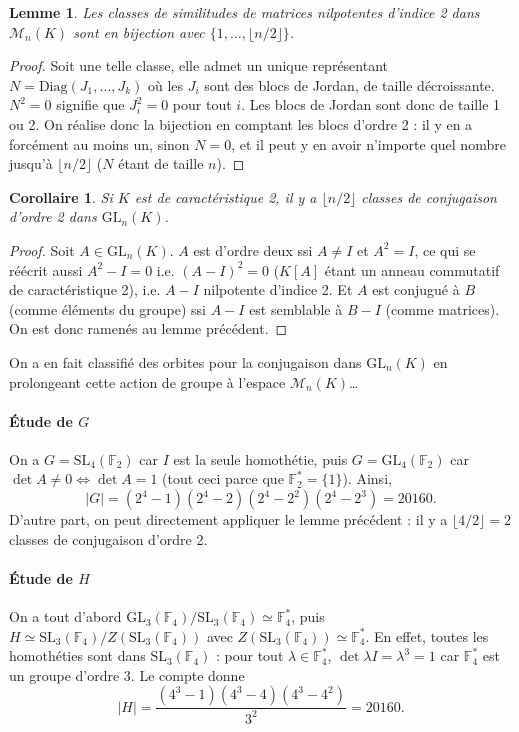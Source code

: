 \documentclass[a4paper, 11pt]{article}
\def\F{\mathbb{F}}
\def\M{\mathcal{M}}
\def\GL{\mathrm{GL}}
\def\SL{\mathrm{SL}}
\newtheorem*{lemma}{Lemme}
\newtheorem*{corollary}{Corollaire}
\begin{document}
\begin{lemma}
  Les classes de similitudes de matrices nilpotentes d'indice 2 dans $\M_n(K)$
  sont en bijection avec $\{1, \ldots, \lfloor n/2 \rfloor\}$.
\end{lemma}
\begin{proof}
  Soit une telle classe, elle admet un unique représentant $N =
  \mathrm{Diag}(J_1, \ldots, J_k)$ où les $J_i$ sont des blocs de Jordan, de
  taille décroissante. $N^2 = 0$ signifie que $J_i^2 = 0$ pour tout $i$. Les
  blocs de Jordan sont donc de taille 1 ou 2. On réalise donc la bijection en
  comptant les blocs d'ordre 2 : il y en a forcément au moins un, sinon $N = 0$,
  et il peut y en avoir n'importe quel nombre jusqu'à $\lfloor n/2 \rfloor$ ($N$
  étant de taille $n$).
\end{proof}
\begin{corollary}
  Si $K$ est de caractéristique 2, il y a $\lfloor n/2 \rfloor$ classes de
  conjugaison d'ordre 2 dans $\GL_n(K)$.
\end{corollary}
\begin{proof}
  Soit $A \in \GL_n(K)$. $A$ est d'ordre deux ssi $A \neq I$ et $A^2 = I$, ce
  qui se réécrit aussi $A^2 - I = 0$ i.e. $(A-I)^2 = 0$ ($K[A]$ étant un anneau
  commutatif de caractéristique 2), i.e. $A-I$ nilpotente d'indice 2. Et $A$ est
  conjugué à $B$ (comme éléments du groupe) ssi $A-I$ est semblable à $B-I$
  (comme matrices). On est donc ramenés au lemme précédent.
\end{proof}
On a en fait classifié des orbites pour la conjugaison dans $\GL_n(K)$ en
prolongeant cette action de groupe à l'espace $\M_n(K)$…

\paragraph{Étude de $G$}

On a $G = \SL_4(\F_2)$ car $I$ est la seule homothétie, puis $G = \GL_4(\F_2)$
car $\det A \neq 0 \Leftrightarrow \det A = 1$ (tout ceci parce que $\F_2^* =
\{1\}$). Ainsi, 
\[ |G| = (2^4 - 1)(2^4 - 2)(2^4 - 2^2)(2^4 - 2^3) = 20160. \]
D'autre part, on peut directement appliquer le lemme précédent : il y a $\lfloor
4/2 \rfloor = 2$ classes de conjugaison d'ordre 2.

\paragraph{Étude de $H$}

On a tout d'abord $\GL_3(\F_4)/\SL_3(\F_4) \simeq \F_4^*$, puis $H \simeq
\SL_3(\F_4)/Z(\SL_3(\F_4))$ avec $Z(\SL_3(\F_4)) \simeq \F_4^*$. En effet,
toutes les homothéties sont dans $\SL_3(\F_4)$ : pour tout $\lambda \in \F_4^*$,
$\det \lambda I = \lambda^3 = 1$ car $\F_4^*$ est un groupe d'ordre 3. Le compte
donne
\[ |H| = \frac{(4^3 - 1)(4^3 - 4)(4^3 - 4^2)}{3^2} = 20160. \]
\end{document}
